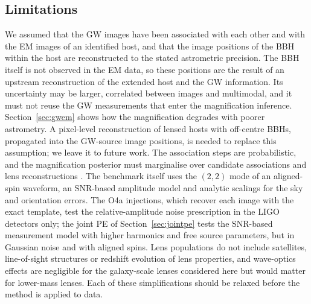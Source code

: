 \subsection{Limitations}
We assumed that the GW images have been associated with each other and with the EM images of an identified host, and that the image positions of the BBH within the host are reconstructed to the stated astrometric precision. The BBH itself is not observed in the EM data, so these positions are the result of an upstream reconstruction of the extended host and the GW information. Its uncertainty may be larger, correlated between images and multimodal, and it must not reuse the GW measurements that enter the magnification inference. Section~\ref{sec:gwem} shows how the magnification degrades with poorer astrometry. A pixel-level reconstruction of lensed hosts with off-centre BBHs, propagated into the GW-source image positions, is needed to replace this assumption; we leave it to future work. The association steps are probabilistic, and the magnification posterior must marginalise over candidate associations and lens reconstructions \citep{hannuksela2020localizing,wempe2022lensing,uronen2026galacticcentres}. The benchmark itself uses the $(2,2)$ mode of an aligned-spin waveform, an SNR-based amplitude model and analytic scalings for the sky and orientation errors. The O4a injections, which recover each image with the exact template, test the relative-amplitude noise prescription in the LIGO detectors only; the joint PE of Section~\ref{sec:jointpe} tests the SNR-based measurement model with higher harmonics and free source parameters, but in Gaussian noise and with aligned spins. Lens populations do not include satellites, line-of-sight structures or redshift evolution of lens properties, and wave-optics effects are negligible for the galaxy-scale lenses considered here but would matter for lower-mass lenses. Each of these simplifications should be relaxed before the method is applied to data.

